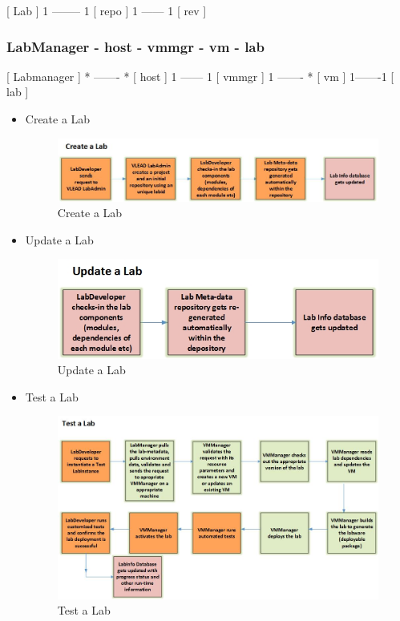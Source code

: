 \documentclass[11pt]{article}
\begin{document}
 [ Lab ] 1 -------- 1 [ repo ] 1 ------ 1 [ rev ]

\subsubsection{LabManager - host - vmmgr - vm - lab}
\label{sec-3.3.3}


 [ Labmanager ] * ------- * [ host ] 1 ------ 1 [ vmmgr ] 1 ------- * [ vm ] 1-------1 [ lab ]

\begin{itemize}

\item Create a Lab\\
\label{sec-3.4.1}


\begin{figure}[H]
\centering
\includegraphics[width=16cm]{Create-a-Lab.jpg}
\caption{Create a Lab}
\end{figure}


\item Update a Lab\\
\label{sec-3.4.2}


\begin{figure}[H]
\centering
\includegraphics[width=12cm]{Update-a-lab.jpg}
\caption{Update a Lab}
\end{figure}


\item Test a Lab\\
\label{sec-3.4.3}


\begin{figure}[H]
\centering
\includegraphics[width=16cm]{Test-a-lab.jpg}
\caption{Test a Lab}
\end{figure}



\end{itemize}
\end{document}
